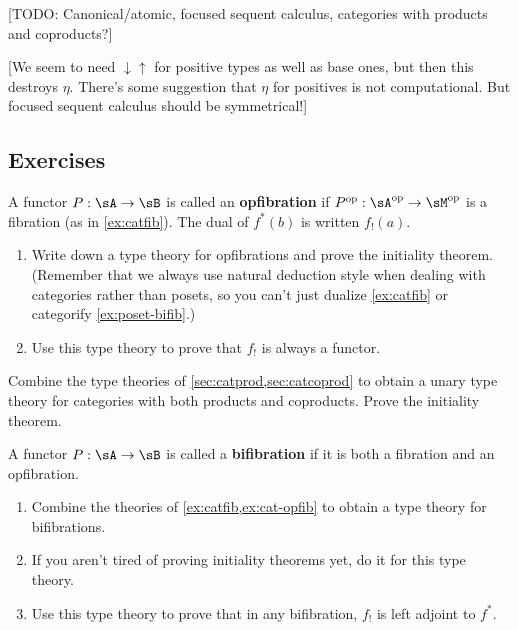 \documentclass{book}
\newcommand{\atomcan}{\ensuremath{\mathord{\downarrow\uparrow}}}
\begin{document}
[TODO: Canonical/atomic, focused sequent calculus, categories with products and coproducts?]

[We seem to need $\atomcan$ for positive types as well as base ones, but then this destroys $\eta$.  There's some suggestion that $\eta$ for positives is not computational.  But focused sequent calculus should be symmetrical!]

\subsection*{Exercises}

\begin{ex}\label{ex:cat-opfib}
  A functor $P:\sA\to\sB$ is called an \textbf{opfibration} if $P\op:\sA\op\to\sM\op$ is a fibration (as in \cref{ex:catfib}).
  The dual of $f^*(b)$ is written $f_!(a)$.
  \begin{enumerate}
  \item Write down a type theory for opfibrations and prove the initiality theorem.
    (Remember that we always use natural deduction style when dealing with categories rather than posets, so you can't just dualize \cref{ex:catfib} or categorify \cref{ex:poset-bifib}.)
  \item Use this type theory to prove that $f_!$ is always a functor.
  \end{enumerate}
\end{ex}

\begin{ex}\label{ex:cat-prod-coprod}
  Combine the type theories of \cref{sec:catprod,sec:catcoprod} to obtain a unary type theory for categories with both products and coproducts.
  Prove the initiality theorem.
\end{ex}

\begin{ex}\label{ex:cat-bifib}
  A functor $P:\sA\to\sB$ is called a \textbf{bifibration} if it is both a fibration and an opfibration.
  \begin{enumerate}
  \item Combine the theories of \cref{ex:catfib,ex:cat-opfib} to obtain a type theory for bifibrations.
  \item If you aren't tired of proving initiality theorems yet, do it for this type theory.
  \item Use this type theory to prove that in any bifibration, $f_!$ is left adjoint to $f^*$.
  \end{enumerate}
\end{ex}
\end{document}
